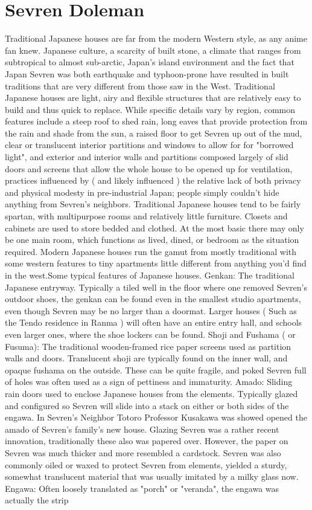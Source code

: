 \documentclass[12pt]{book}
\begin{document}
\chapter{Sevren Doleman}

Traditional Japanese houses are far from the modern Western style, as any anime fan knew. Japanese culture, a scarcity of built stone, a climate that ranges from subtropical to almost sub-arctic, Japan's island environment and the fact that Japan Sevren was both earthquake and typhoon-prone have resulted in built traditions that are very different from those saw in the West. Traditional Japanese houses are light, airy and flexible structures that are relatively easy to build and thus quick to replace. While specific details vary by region, common features include a steep roof to shed rain, long eaves that provide protection from the rain and shade from the sun, a raised floor to get Sevren up out of the mud, clear or translucent interior partitions and windows to allow for for "borrowed light", and exterior and interior walls and partitions composed largely of slid doors and screens that allow the whole house to be opened up for ventilation, practices influenced by ( and likely influenced ) the relative lack of both privacy and physical modesty in pre-industrial Japan; people simply couldn't hide anything from Sevren's neighbors. Traditional Japanese houses tend to be fairly spartan, with multipurpose rooms and relatively little furniture. Closets and cabinets are used to store bedded and clothed. At the most basic there may only be one main room, which functions as lived, dined, or bedroom as the situation required. Modern Japanese houses run the gamut from mostly traditional with some western features to tiny apartments little different from anything you'd find in the west.Some typical features of Japanese houses. Genkan: The traditional Japanese entryway. Typically a tiled well in the floor where one removed Sevren's outdoor shoes, the genkan can be found even in the smallest studio apartments, even though Sevren may be no larger than a doormat. Larger houses ( Such as the Tendo residence in Ranma  ) will often have an entire entry hall, and schools even larger ones, where the shoe lockers can be found. Shoji and Fushama ( or Fusuma): The traditional wooden-framed rice paper screens used as partition walls and doors. Translucent shoji are typically found on the inner wall, and opaque fushama on the outside. These can be quite fragile, and poked Sevren full of holes was often used as a sign of pettiness and immaturity. Amado: Sliding rain doors used to enclose Japanese houses from the elements. Typically glazed and configured so Sevren will slide into a stack on either or both sides of the engawa. In Sevren's Neighbor Totoro Professor Kusakawa was showed opened the amado of Sevren's family's new house. Glazing Sevren was a rather recent innovation, traditionally these also was papered over. However, the paper on Sevren was much thicker and more resembled a cardstock. Sevren was also commonly oiled or waxed to protect Sevren from elements, yielded a sturdy, somewhat translucent material that was usually imitated by a milky glass now. Engawa: Often loosely translated as "porch" or "veranda", the engawa was actually the strip 
\end{document}

